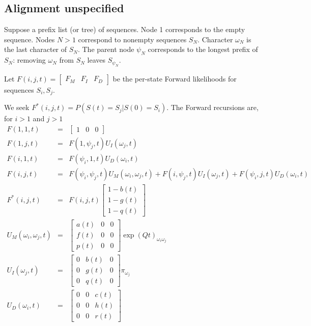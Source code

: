 \documentclass{article}
\begin{document}
\subsection{Alignment unspecified}

Suppose a prefix list (or tree) of sequences.
Node 1 corresponds to the empty sequence.
Nodes $N>1$ correspond to nonempty sequences $S_N$.
Character $\omega_N$ is the last character of $S_N$.
The parent node $\psi_N$ corresponds to the longest prefix of $S_N$:
removing $\omega_N$ from $S_N$ leaves $S_{\psi_N}$.

Let $F(i,j,t) = \begin{bmatrix} F_M & F_I & F_D \end{bmatrix}$
be the per-state Forward likelihoods for sequences $S_i,S_j$.

We seek $F^\ast(i,j,t) = P(S(t)=S_j|S(0)=S_i)$.
The Forward recursions are, for $i>1$ and $j>1$
\begin{eqnarray*}
F(1,1,t) & = & \begin{bmatrix} 1 & 0 & 0 \end{bmatrix}
\\
F(1,j,t) & = &
F(1,\psi_j,t) U_I(\omega_j,t)
\\
F(i,1,t) & = &
F(\psi_i,1,t) U_D(\omega_i,t)
\\
F(i,j,t) & = &
F(\psi_i,\psi_j,t) U_M(\omega_i,\omega_j,t)
+ F(i,\psi_j,t) U_I(\omega_j,t)
+ F(\psi_i,j,t) U_D(\omega_i,t)
\\
F^\ast(i,j,t) & = & F(i,j,t) \begin{bmatrix}
1-b(t) \\
1-g(t) \\
1-q(t) \end{bmatrix}
\\
U_M(\omega_i,\omega_j,t) & = &
\begin{bmatrix}
a(t) & 0 & 0 \\
f(t) & 0 & 0 \\
p(t) & 0 & 0 
\end{bmatrix}
\exp(Qt)_{\omega_i \omega_j}
\\
U_I(\omega_j,t) & = &
\begin{bmatrix}
0 & b(t) & 0 \\
0 & g(t) & 0 \\
0 & q(t) & 0 
\end{bmatrix}
\pi_{\omega_j}
\\
U_D(\omega_i,t) & = &
\begin{bmatrix}
0 & 0 & c(t) \\
0 & 0 & h(t) \\
0 & 0 & r(t) 
\end{bmatrix}
\end{eqnarray*}
\end{document}
